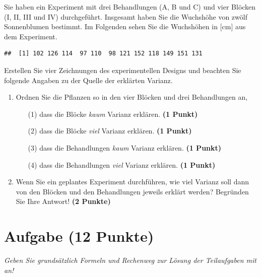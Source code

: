 \documentclass[a4paper, 10pt]{scrartcl}\usepackage[]{graphicx}\usepackage[]{xcolor}
\makeatletter
\newenvironment{kframe}{%
 \def\at@end@of@kframe{}%
 \ifinner\ifhmode%
  \def\at@end@of@kframe{\end{minipage}}%
  \begin{minipage}{\columnwidth}%
 \fi\fi%
 \def\FrameCommand##1{\hskip\@totalleftmargin \hskip-\fboxsep
 \colorbox{shadecolor}{##1}\hskip-\fboxsep
     \hskip-\linewidth \hskip-\@totalleftmargin \hskip\columnwidth}%
 \MakeFramed {\advance\hsize-\width
   \@totalleftmargin\z@ \linewidth\hsize
   \@setminipage}}%
 {\par\unskip\endMakeFramed%
 \at@end@of@kframe}
\newenvironment{knitrout}{}{} %
\makeatother
\begin{document}
Sie haben ein Experiment mit drei Behandlungen (A, B und C) und vier
Bl{\"o}cken (I, II, III und IV) durchgef{\"u}hrt. Insgesamt haben Sie die Wuchsh{\"o}he
von zw{\"o}lf Sonnenblumen bestimmt. Im Folgenden sehen Sie die Wuchsh{\"o}hen in
[cm] aus dem Experiment.


\begin{knitrout}
\color{fgcolor}\begin{kframe}
\begin{verbatim}
##  [1] 102 126 114  97 110  98 121 152 118 149 151 131
\end{verbatim}
\end{kframe}
\end{knitrout}

Erstellen Sie vier Zeichnungen des experimentellen Designs und beachten
Sie folgende Angaben zu der Quelle der erkl{\"a}rten Varianz. 

\begin{enumerate}
\item Ordnen Sie die Pflanzen so in den vier Bl{\"o}cken und drei Behandlungen an,
  \begin{enumerate}
  \item[(1)] dass die Bl{\"o}cke \textit{kaum} Varianz erkl{\"a}ren. \textbf{(1 Punkt)}
  \item[(2)] dass die Bl{\"o}cke \textit{viel} Varianz erkl{\"a}ren. \textbf{(1 Punkt)}  
  \item[(3)] dass die Behandlungen \textit{kaum} Varianz erkl{\"a}ren. \textbf{(1 Punkt)}
  \item[(4)] dass die Behandlungen \textit{viel} Varianz erkl{\"a}ren. \textbf{(1 Punkt)}
  \end{enumerate}
\item Wenn Sie ein geplantes Experiment durchf{\"u}hren, wie viel Varianz soll dann von
  den Bl{\"o}cken und den Behandlungen jeweils erkl{\"a}rt werden? Begr{\"u}nden Sie
  Ihre Antwort! \textbf{(2 Punkte)}
\end{enumerate}
 
\clearpage

\section{Aufgabe \hfill (12 Punkte)}

\textit{Geben Sie grunds{\"a}tzlich Formeln und Rechenweg zur L{\"o}sung der
  Teilaufgaben mit an!} \\[1Ex]
\end{document}
